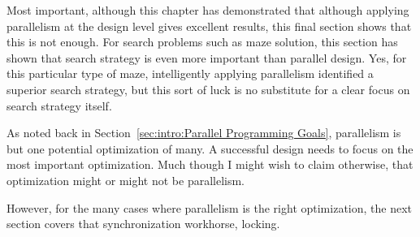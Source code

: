 Most important, although this chapter has demonstrated that although applying
parallelism at the design level gives excellent results, this final
section shows that this is not enough.
For search problems such as maze solution, this section has shown that
search strategy is even more important than parallel design.
Yes, for this particular type of maze, intelligently applying parallelism
identified a superior search strategy, but this sort of luck is no
substitute for a clear focus on search strategy itself.

As noted back in Section~\ref{sec:intro:Parallel Programming Goals},
parallelism is but one potential optimization of many.
A successful design needs to focus on the most important optimization.
Much though I might wish to claim otherwise, that optimization might
or might not be parallelism.

However, for the many cases where parallelism is the right optimization,
the next section covers that synchronization workhorse, locking.
